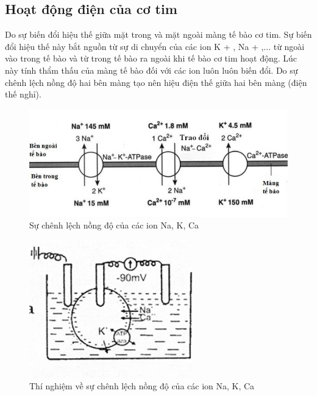 \subsection{Hoạt động điện của cơ tim}
Do sự biến đổi hiệu thế giữa mặt trong và mặt ngoài màng tế bào cơ tim. Sự biến đổi hiệu thế này bắt nguồn từ sự di chuyển của các ion K + , Na + ,... từ ngoài vào trong tế bào và từ trong tế bào ra ngoài khi tế bào cơ tim hoạt động. Lúc này tính thẩm thấu của màng tế bào đối với các ion luôn luôn biến đổi. Do sự chênh lệch nồng độ hai bên màng tạo nên hiệu điện thế giữa hai bên màng (điện thế nghỉ).
\newpage
\begin{center}
    \begin{figure}[htp]
    \begin{center}
     \includegraphics[scale=.4]{image/week1/h21.png}
    \end{center}
    \caption{Sự chênh lệch nồng độ của các ion Na, K, Ca \cite{huongdanDTT}}
    \end{figure}
\end{center}
\begin{center}
    \begin{figure}[htp]
    \begin{center}
     \includegraphics[scale=.6]{image/week1/h22.png}
    \end{center}
    \caption{Thí nghiệm về sự chênh lệch nồng độ của các ion Na, K, Ca \cite{huongdanDTT}}
    \end{figure}
\end{center}


